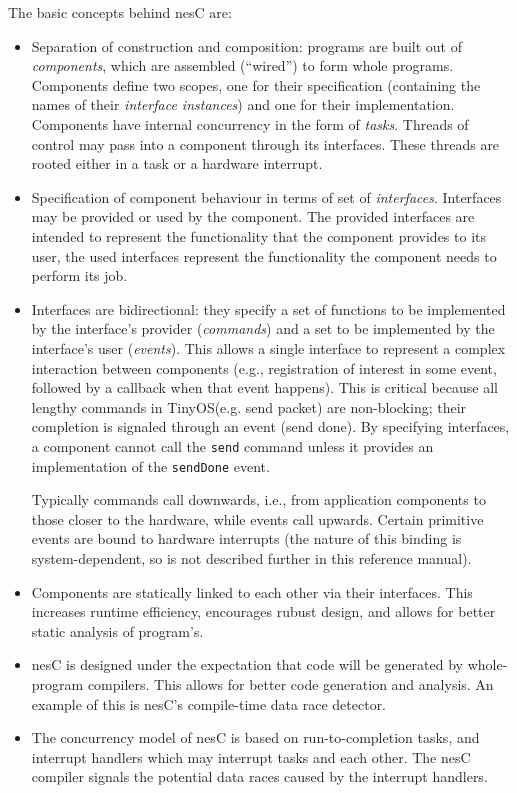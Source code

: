 \documentclass[11pt,letterpaper]{article}
\newcommand{\code}[1]{{\tt #1}}
\newcommand{\nesc}{nesC\xspace}
\newcommand{\tinyos}{TinyOS\xspace}
\begin{document}
The basic concepts behind \nesc are:
\begin{itemize}
\item Separation of construction and composition: programs are built out of
\emph{components}, which are assembled (``wired'') to form whole
programs. Components define two scopes, one for their specification
(containing the names of their \emph{interface instances}) and one for
their implementation. Components have internal concurrency in the form of
\emph{tasks}. Threads of control may pass into a component through its
interfaces. These threads are rooted either in a task or a hardware
interrupt.

\item Specification of component behaviour in terms of set of
\emph{interfaces}. Interfaces may be provided or used by the component. The
provided interfaces are intended to represent the functionality that the
component provides to its user, the used interfaces represent the
functionality the component needs to perform its job.

\item Interfaces are bidirectional: they specify a set of functions to be
implemented by the interface's provider (\emph{commands}) and a set to be
implemented by the interface's user (\emph{events}). This allows a single
interface to represent a complex interaction between components (e.g.,
registration of interest in some event, followed by a callback when
that event happens). This is critical because all lengthy commands in
\tinyos (e.g. send packet) are non-blocking; their completion is
signaled through an event (send done). By specifying interfaces, a
component cannot call the \code{send} command unless it provides an
implementation of the \code{sendDone} event.

Typically commands call downwards, i.e., from application components to
those closer to the hardware, while events call upwards. Certain primitive
events are bound to hardware interrupts (the nature of this binding is
system-dependent, so is not described further in this reference manual).

\item Components are statically linked to each other via their interfaces.
This increases runtime efficiency, encourages rubust design, and allows for
better static analysis of program's.

\item \nesc is designed under the expectation that code will be generated
by whole-program compilers. This allows for better code generation and
analysis. An example of this is nesC's compile-time data race detector.

\item The concurrency model of \nesc is based on run-to-completion tasks,
and interrupt handlers which may interrupt tasks and each other. The \nesc
compiler signals the potential data races caused by the interrupt handlers.
\end{itemize}
\end{document}
